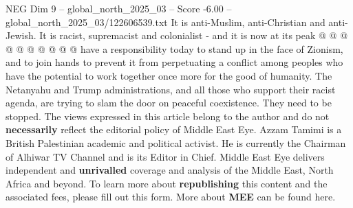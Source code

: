 \begin{textsample}{NEG Dim 9 – global\_north\_2025\_03 – Score -6.00 – global\_north\_2025\_03/122606539.txt}
It is anti-Muslim, anti-Christian and anti-Jewish.
It is racist, supremacist and colonialist - and it is now at its peak @ @ @ @ @ @ @ @ @ @ have a responsibility today to stand up in the face of Zionism, and to join hands to prevent it from perpetuating a conflict among peoples who have the potential to work together once more for the good of humanity.
The Netanyahu and Trump administrations, and all those who support their racist agenda, are trying to slam the door on peaceful coexistence.
They need to be stopped.
The views expressed in this article belong to the author and do not \textbf{necessarily} reflect the editorial policy of Middle East Eye.
Azzam Tamimi is a British Palestinian academic and political activist.
He is currently the Chairman of Alhiwar TV Channel and is its Editor in Chief.
Middle East Eye delivers independent and \textbf{unrivalled} coverage and analysis of the Middle East, North Africa and beyond.
To learn more about \textbf{republishing} this content and the associated fees, please fill out this form.
More about \textbf{MEE} can be found here.

\end{textsample}
